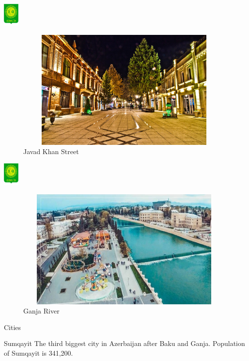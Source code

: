 \documentclass[hyperref={pdfpagemode=FullScreen}]{beamer}
\begin{document}
\begin{frame}{
  \includegraphics[width=.9cm, height=1.2cm]{img/gence04.png}
}
    \begin{figure}
        \includegraphics[width=11cm, height=6cm]{img/gence02.jpg}
        \caption{Javad Khan Street} 
    \end{figure}
  
\end{frame}

\begin{frame}{\includegraphics[width=.9cm, height=1.2cm]{img/gence04.png}}
    \begin{figure}
        \includegraphics[width=11cm, height=6cm]{img/gence03.jpg}
        \caption{Ganja River} 
    \end{figure}
\end{frame}

\begin{frame}{Cities}
\begin{alertblock}{Sumqayit}
\justifying The third biggest city in Azerbaijan after Baku and Ganja. Population of Sumqayit is 341,200.
\end{alertblock}
\end{frame}
\end{document}
